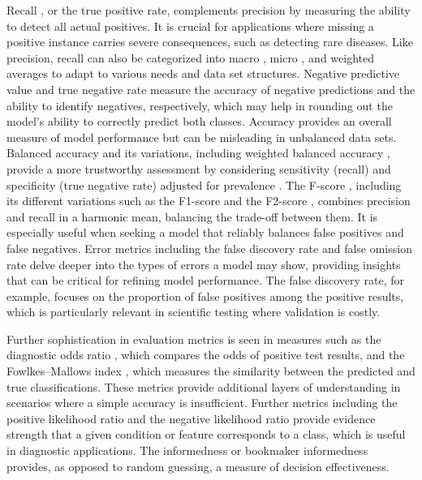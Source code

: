\documentclass{article}
\begin{document}
Recall \cite{yerushalmy1947statistical, altman1994diagnostic}, or the true positive rate, complements precision by measuring the ability to detect all actual positives. It is crucial for applications where missing a positive instance carries severe consequences, such as detecting rare diseases. Like precision, recall can also be categorized into macro \cite{yang1999evaluation, sebastiani2002machine, rosenberg2012classifying, yang2020edgernn}, micro \cite{yang1999evaluation, sebastiani2002machine}, and weighted averages \cite{gordon1988effect, han2014rule} to adapt to various needs and data set structures. Negative predictive value \cite{altman1994statistics, fletcher2019clinical} and true negative rate \cite{yerushalmy1947statistical, altman1994diagnostic} measure the accuracy of negative predictions and the ability to identify negatives, respectively, which may help in rounding out the model's ability to correctly predict both classes. Accuracy \cite{metz1978basic, taylor1997introduction} provides an overall measure of model performance but can be misleading in unbalanced data sets. Balanced accuracy \cite{brodersen2010balanced, kelleher2020fundamentals} and its variations, including weighted balanced accuracy \cite{salman2017detection, infante2023factors}, provide a more trustworthy assessment by considering sensitivity (recall) and specificity (true negative rate) adjusted for prevalence \cite{rothman2012epidemiology, bruce2018quantitative}. The F-score \cite{van2004geometry, taha2015metrics}, including its different variations such as the F1-score \cite{van2004geometry, taha2015metrics} and the F2-score \cite{van2004geometry, taha2015metrics}, combines precision and recall in a harmonic mean, balancing the trade-off between them. It is especially useful when seeking a model that reliably balances false positives and false negatives. Error metrics including the false discovery rate \cite{benjamini1995controlling, benjamini2001control} and false omission rate \cite{zafar2017fairness} delve deeper into the types of errors a model may show, providing insights that can be critical for refining model performance. The false discovery rate, for example, focuses on the proportion of false positives among the positive results, which is particularly relevant in scientific testing where validation is costly.

Further sophistication in evaluation metrics is seen in measures such as the diagnostic odds ratio \cite{glas2003diagnostic, doust2004systematic}, which compares the odds of positive test results, and the Fowlkes--Mallows index \cite{fowlkes1983method, halkidi2001clustering}, which measures the similarity between the predicted and true classifications. These metrics provide additional layers of understanding in scenarios where a simple accuracy is insufficient. Further metrics including the positive likelihood ratio \cite{swets1973relative, deeks2004diagnostic} and the negative likelihood ratio \cite{swets1973relative, deeks2004diagnostic} provide evidence strength that a given condition or feature corresponds to a class, which is useful in diagnostic applications. The informedness or bookmaker informedness \cite{peirce1884numerical, youden1950index} provides, as opposed to random guessing, a measure of decision effectiveness.
\end{document}
